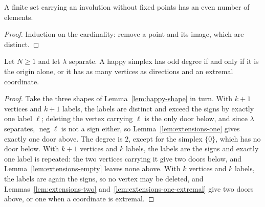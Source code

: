 \begin{lemma}
\label{lem:involution}
\leanok
A finite set carrying an involution without fixed points has an even number of
elements.
\end{lemma}
\begin{proof}
\leanok
Induction on the cardinality: remove a point and its image, which are distinct.
\end{proof}

\begin{theorem}
\label{thm:odd-degree}
\leanok
{}
Let $N \ge 1$ and let $\lambda$ separate. A happy simplex has odd degree if and only if
it is the origin alone, or it has as many vertices as directions and an extremal
coordinate.
\end{theorem}
\begin{proof}
\leanok
{}
Take the three shapes of Lemma~\ref{lem:happy-shape} in turn. With $k+1$ vertices and
$k+1$ labels, the labels are distinct and exceed the signs by exactly one label
$\ell$; deleting the vertex carrying $\ell$ is the only door below, and since $\lambda$
separates, $\operatorname{neg}\ell$ is not a sign either, so
Lemma~\ref{lem:extensions-one} gives exactly one door above. The degree is $2$, except
for the simplex $\{0\}$, which has no door below. With $k+1$ vertices and $k$ labels,
the labels are the signs and exactly one label is repeated: the two vertices carrying
it give two doors below, and Lemma~\ref{lem:extensions-empty} leaves none above. With
$k$ vertices and $k$ labels, the labels are again the signs, so no vertex may be
deleted, and Lemmas~\ref{lem:extensions-two} and~\ref{lem:extensions-one-extremal}
give two doors above, or one when a coordinate is extremal.
\end{proof}

